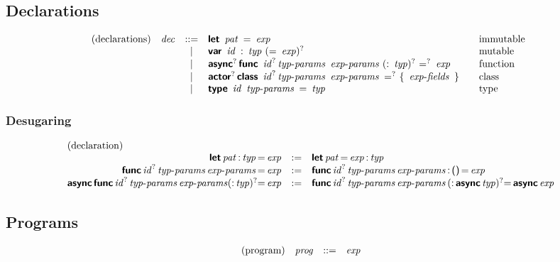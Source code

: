 \subsection*{Declarations}

$$
\begin{array}{@{}lrcl@{\qquad}l}
\text{(declarations)} & \x{dec} &::=&
  \KK{let}~\x{pat}~\K=~\x{exp}
    & \text{immutable} \\&&|&
  \KK{var}~\x{id}~\K:~\x{typ}~(\K=~\x{exp})^?
    & \text{mutable} \\&&|&
  \KK{async}^?\, \KK{func}~\x{id}^? \x{typ-params}~\x{exp-params}~(\K:~\x{typ})^?~\K=^?~\x{exp}
    & \text{function} \\&&|&
  \KK{actor}^?\, \KK{class}~\x{id}^? \x{typ-params}~\x{exp-params}~\K=^?~\K\{~\x{exp-fields}~\K\}
    & \text{class} \\&&|&
  \KK{type}~\x{id}~\x{typ-params}~\K=~\x{typ}
    & \text{type} \\
\end{array}
$$

\subsubsection*{Desugaring}

$$
\begin{array}{@{}rcl@{}}
\text{(declaration)} \hfill \\
\KK{let} \x{pat} \K: \x{typ} \K= \x{exp} &:=&
  \KK{let} \x{pat} \K= \x{exp} \K: \x{typ} \\
\KK{func} \x{id}^? \x{typ-params} \x{exp-params} \K= \x{exp} &:=&
  \KK{func} \x{id}^? \x{typ-params} \x{exp-params} \K: \, \K{()} \, \K= \x{exp} \\
\KK{async} \, \KK{func} \x{id}^? \x{typ-params} \x{exp-params} (\K: \x{typ})^? \K= \x{exp} &:=&
\KK{func} \x{id}^? \x{typ-params} \x{exp-params} \, (\K: \, \KK{async} \x{typ})^? \K= \, \KK{async} \x{exp} \\
\end{array}
$$


\subsection*{Programs}

$$
\begin{array}{@{}lrcl@{\qquad}l}
\text{(program)} & \x{prog} &::=&
  \x{exp}
\end{array}
$$
